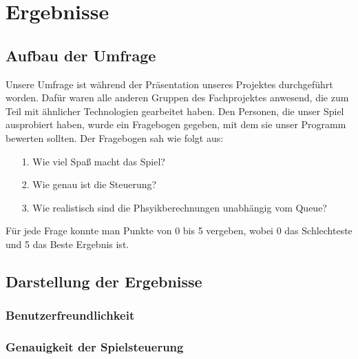 
\chapter{Ergebnisse}


\section{Aufbau der Umfrage}
Unsere Umfrage ist während der Präsentation unseres Projektes durchgeführt worden. Dafür waren alle anderen Gruppen des Fachprojektes anwesend, die zum Teil mit ähnlicher Technologien gearbeitet haben. Den Personen, die unser Spiel ausprobiert haben, wurde ein Fragebogen gegeben, mit dem sie unser Programm bewerten sollten. Der Fragebogen sah wie folgt aus: 
\begin{itemize}
	\item [1.] Wie viel Spaß macht das Spiel?
	\item [2.] Wie genau ist die Steuerung?
	\item [3.] Wie realistisch sind die Phsyikberechnungen unabhängig vom Queue?
\end{itemize}
Für jede Frage konnte man Punkte von 0 bis 5 vergeben, wobei 0 das Schlechteste  und 5 das Beste Ergebnis ist.
\section{Darstellung der Ergebnisse}
\subsection{Benutzerfreundlichkeit}
\subsection{Genauigkeit der Spielsteuerung}



